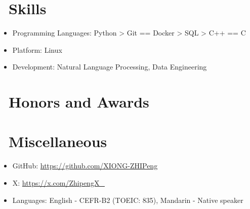 \documentclass{resume}
\begin{document}

\section{\faCogs\ Skills}
\begin{itemize}[parsep=0.5ex]
  \item Programming Languages: Python > Git == Docker > SQL > C++ == C
  \item Platform: Linux
  \item Development: Natural Language Processing, Data Engineering
\end{itemize}

\section{\faHeartO\ Honors and Awards}

\section{\faInfo\ Miscellaneous}
\begin{itemize}[parsep=0.5ex]
  \item GitHub: \url{https://github.com/XIONG-ZHIPeng}
  \item X: \url{https://x.com/ZhipengX\_}
  \item Languages: English - CEFR-B2 (TOEIC: 835), Mandarin - Native speaker
\end{itemize}

%
%
\end{document}
